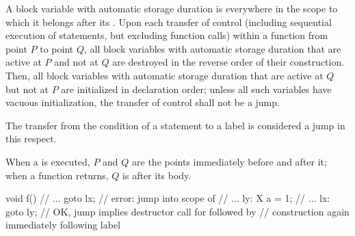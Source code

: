 \pnum
{}%
%
%
A block variable with automatic storage duration
is  everywhere in the scope to which it belongs
after its .
%
%
Upon each transfer of control (including sequential execution of statements,
but excluding function calls)
within a function from point $P$ to point $Q$,
all block variables with automatic storage duration
that are active at $P$ and not at $Q$ are destroyed in the reverse order of their construction.
Then, all block variables with automatic storage duration
that are active at $Q$ but not at $P$ are initialized in declaration order;
unless all such variables have vacuous initialization,
the transfer of control shall not be a jump.
\begin{footnote}
The transfer from the condition of a  statement to a
 label is considered a jump in this respect.
\end{footnote}
When a  is executed,
$P$ and $Q$ are the points immediately before and after it;
when a function returns, $Q$ is after its body.
\begin{example}
\begin{codeblock}
void f() {
  // ...
  goto lx;          // error: jump into scope of 
  // ...
ly:
  X a = 1;
  // ...
lx:
  goto ly;          // OK, jump implies destructor call for  followed by
                    // construction again immediately following label 
}
\end{codeblock}
\end{example}

